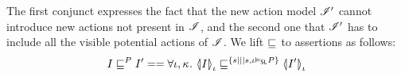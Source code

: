 The first conjunct expresses the fact that the new action model $\lmod'$ cannot introduce new actions not present in $\lmod$, and the second one that $\lmod'$ has to include all the visible potential actions of $\lmod$. We lift $\weakenI{}$ to assertions as follows:
%
\[
	I \weakenI{P} I' == \V{\lenv,\ca{}} \semI[\lenv]{I} \weakenI{\{s|||  s,\lenv\slsat P\}} \semI[\lenv]{I'}
\]
%




